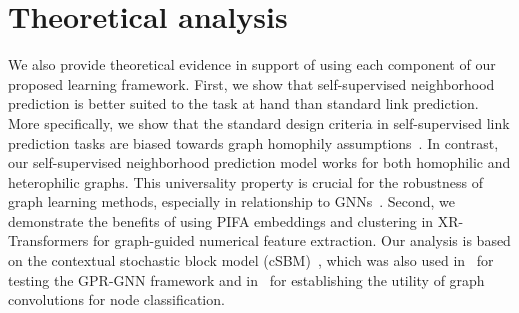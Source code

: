 \documentclass{article} %
\begin{document}
\vspace{-0.2cm}
\section{Theoretical analysis}
We also provide theoretical evidence in support of using each component of our proposed learning framework. First, we show that self-supervised neighborhood prediction is better suited to the task at hand than standard link prediction. More specifically, we show that the standard design criteria in self-supervised link prediction tasks are biased towards graph homophily assumptions~\citep{mcpherson2001birds,klicpera2018predict}. In contrast, our self-supervised neighborhood prediction model works for both homophilic and heterophilic graphs. This universality property is crucial for the robustness of graph learning methods, especially in relationship to GNNs~\citep{chien2020adaptive}. Second, we demonstrate the benefits of using PIFA embeddings and clustering in XR-Transformers for graph-guided numerical feature extraction. 
Our analysis is based on the contextual stochastic block model (cSBM)~\citep{deshpande2018contextual}, which was also used in~\cite{chien2020adaptive} for testing the GPR-GNN framework and in~\cite{baranwal2021graph} for establishing the utility of graph convolutions for node classification.
\end{document}
